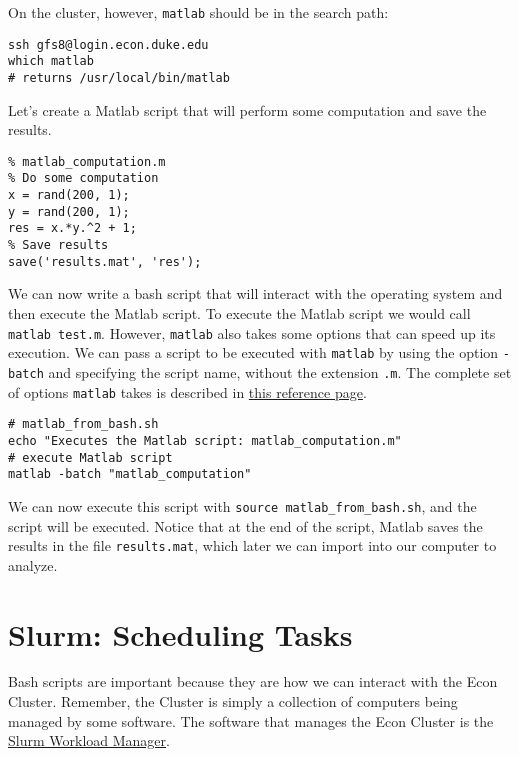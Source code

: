 \documentclass[12pt, a4paper]{article}
\begin{document}
On the cluster, however, \texttt{matlab} should be in the search path:
\lstset{language=bash,label= ,caption= ,captionpos=b,firstnumber=1,numbers=left,style=bash}
\begin{lstlisting}
ssh gfs8@login.econ.duke.edu
which matlab
# returns /usr/local/bin/matlab
\end{lstlisting}

Let's create a Matlab script that will perform some computation and save the results.
\lstset{language=matlab,label= ,caption= ,captionpos=b,firstnumber=1,numbers=left,style=Matlab-editor}
\begin{lstlisting}
% matlab_computation.m
% Do some computation
x = rand(200, 1);
y = rand(200, 1);
res = x.*y.^2 + 1;
% Save results
save('results.mat', 'res');
\end{lstlisting}

We can now write a bash script that will interact with the operating system and then execute the Matlab script.
To execute the Matlab script we would call \texttt{matlab test.m}.
However, \texttt{matlab} also takes some options that can speed up its execution.
We can pass a script to be executed with \texttt{matlab} by using the option \texttt{-batch} and specifying the script name, without the extension \texttt{.m}.
The complete set of options \texttt{matlab} takes is described in \href{https://www.mathworks.com/help/matlab/ref/matlablinux.html?s\_tid}{this reference page}.
\lstset{language=bash,label= ,caption= ,captionpos=b,firstnumber=1,numbers=left,style=bash}
\begin{lstlisting}
# matlab_from_bash.sh
echo "Executes the Matlab script: matlab_computation.m"
# execute Matlab script
matlab -batch "matlab_computation"
\end{lstlisting}
We can now execute this script with \texttt{source matlab\_from\_bash.sh}, and the script will be executed.
Notice that at the end of the script, Matlab saves the results in the file \texttt{results.mat}, which later we can import into our computer to analyze.
\section{Slurm: Scheduling Tasks}
\label{sec:org885da08}
Bash scripts are important because they are how we can interact with the Econ Cluster.
Remember, the Cluster is simply a collection of computers being managed by some software.
The software that manages the Econ Cluster is the \href{https://en.wikipedia.org/wiki/Slurm\_Workload\_Manager}{Slurm Workload Manager}.
\end{document}
